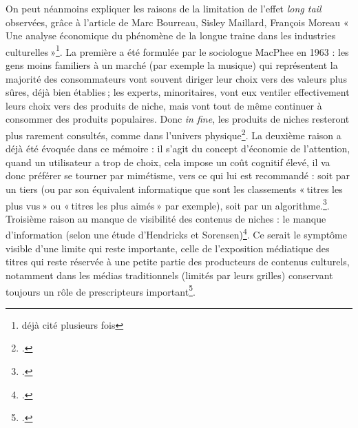On peut néanmoins expliquer les raisons de la limitation de l’effet \textit{long tail} observées, grâce à l’article de Marc Bourreau, Sisley Maillard, François Moreau « Une analyse économique du phénomène de la longue traine dans les industries culturelles »\footnote{déjà cité plusieurs fois}. La première a été formulée par le sociologue MacPhee en 1963 : les gens moins familiers à un marché (par exemple la musique) qui représentent la majorité des consommateurs vont souvent diriger leur choix vers des valeurs plus sûres, déjà bien établies ; les experts, minoritaires, vont eux ventiler effectivement leurs choix vers des produits de niche, mais vont tout de même continuer à consommer des produits populaires. Donc \textit{in fine}, les produits de niches resteront plus rarement consultés, comme dans l'univers physique\footcite[§ 29]{bourreau2015a}. La deuxième raison a déjà été évoquée dans ce mémoire : il s’agit du concept d’économie de l’attention, quand un utilisateur a trop de choix, cela impose un coût cognitif élevé, il va donc préférer se tourner par mimétisme, vers ce qui lui est recommandé : soit par un tiers (ou par son équivalent informatique que sont les classements « titres les plus vus » ou « titres les plus aimés » par exemple), soit par un algorithme.\footcite[§ 39]{bourreau2015a}. Troisième raison au manque de visibilité  des contenus de niches : le manque d'information (selon une étude d’Hendricks et Sorensen)\footcite[§ 40]{bourreau2015a}. Ce serait le symptôme visible d’une limite qui reste importante, celle de l’exposition médiatique des titres qui reste réservée à une petite partie des producteurs de contenus culturels, notamment dans les médias traditionnels (limités par leurs grilles) conservant toujours un rôle de prescripteurs important\footcite[§ 41]{bourreau2015a}.

